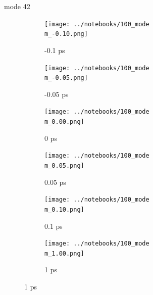 \documentclass{beamer}
\newcommand\w{0.32}
\begin{document}
\renewcommand\m{42}
\begin{frame}{mode \m}
	\begin{figure}
		\centering
		\begin{subfigure}[b]{\w\textwidth}
			\centering
			\texttt{[image: ../notebooks/100\_mode\\m\_-0.10.png]}
			\caption{-0.1 ps}
		\end{subfigure}
		\begin{subfigure}[b]{\w\textwidth}
			\centering
			\texttt{[image: ../notebooks/100\_mode\\m\_-0.05.png]}
			\caption{-0.05 ps}
		\end{subfigure}
		\begin{subfigure}[b]{\w\textwidth}
			\centering
			\texttt{[image: ../notebooks/100\_mode\\m\_0.00.png]}
			\caption{0 ps}
		\end{subfigure}
		\begin{subfigure}[b]{\w\textwidth}
			\centering
			\texttt{[image: ../notebooks/100\_mode\\m\_0.05.png]}
			\caption{0.05 ps}
		\end{subfigure}
		\begin{subfigure}[b]{\w\textwidth}
			\centering
			\texttt{[image: ../notebooks/100\_mode\\m\_0.10.png]}
			\caption{0.1 ps}
		\end{subfigure}
		\begin{subfigure}[b]{\w\textwidth}
			\centering
			\texttt{[image: ../notebooks/100\_mode\\m\_1.00.png]}
			\caption{1 ps}
		\end{subfigure}
	\end{figure}
\end{frame}
\end{document}
